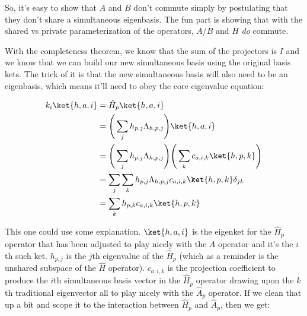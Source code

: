 \begin{answer}
\begin{answerpart}{\ctrois{}}
    So, it's easy to show that $A$ and $B$ don't commute simply by
    postulating that they don't share a simultaneous eigenbasis.  The
    fun part is showing that with the shared vs private
    parameterization of the operators, $A/B$ and $H$ \emph{do}
    commute.
    
    With the completeness theorem, we know that the sum of the
    projectors is $I$ and we know that we can build our new
    simultaneous basis using the original basis kets.  The trick of it
    is that the new simultaneous basis will also need to be an
    eigenbasis, which means it'll need to obey the core eigenvalue
    equation:

    \begin{equation}
      \begin{split}
        k_i \ket{h,a,i}
        &= \hat{H}_p \ket{h,a,i}\\
        &=
        \Bigg(\sum_j h_{p,j}\Lambda_{h,p,j}\Bigg)
        \ket{h,a,i}
        \\
        &=
        \Bigg(\sum_j h_{p,j}\Lambda_{h,p,j}\Bigg)
        \Bigg(\sum_k c_{a,i,k} \ket{h,p,k}\Bigg)
        \\
        &=
        \sum_j \sum_k
        h_{p,j}\Lambda_{h,p,j}
        c_{a,i,k} \ket{h,p,k}
        \delta_{jk}
        \\
        &= \sum_k h_{p,k} c_{a,i,k} \ket{h,p,k}\\
      \end{split}
    \end{equation}

    This one could use some explanation.  $\ket{h,a,i}$ is the
    eigenket for the $\hat{H}_p$ operator that has been adjusted to
    play nicely with the $A$ operator and it's the $i$th such ket.
    $h_{p,j}$ is the $j$th eigenvalue of the $\hat{H}_p$ (which as a
    reminder is the unshared subspace of the $\hat{H}$ operator).
    $c_{a,i,k}$ is the projection coefficient to produce the $i$th
    simultaneous basis vector in the $\hat{H}_p$ operator drawing upon
    the $k$th traditional eigenvector all to play nicely with the
    $\hat{A}_p$ operator.  If we clean that up a bit and scope it to
    the interaction between $\hat{H}_p$ and $\hat{A}_p$, then we get:


\end{answerpart}
\end{answer}
